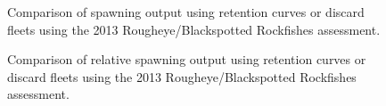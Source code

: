 \documentclass[
]{scrartcl}
\begin{document}
\begin{figure}


\caption{\label{fig-Discard_comp_SO}Comparison of spawning output using
retention curves or discard fleets using the 2013 Rougheye/Blackspotted
Rockfishes assessment.}

\end{figure}%

\begin{figure}


\caption{\label{fig-Discard_comp_RSS}Comparison of relative spawning
output using retention curves or discard fleets using the 2013
Rougheye/Blackspotted Rockfishes assessment.}

\end{figure}%
\end{document}

